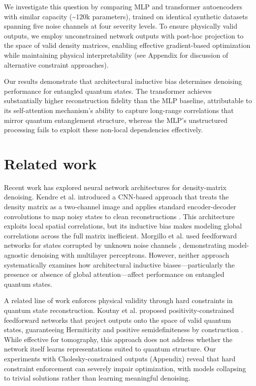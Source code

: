 \documentclass[11pt]{article}
\begin{document}
We investigate this question by comparing MLP and transformer autoencoders with similar capacity (\textasciitilde{}120k parameters), trained on identical synthetic datasets spanning five noise channels at four severity levels. To ensure physically valid outputs, we employ unconstrained network outputs with post-hoc projection to the space of valid density matrices, enabling effective gradient-based optimization while maintaining physical interpretability (see Appendix for discussion of alternative constraint approaches).

Our results demonstrate that architectural inductive bias determines denoising performance for entangled quantum states. The transformer achieves substantially higher reconstruction fidelity than the MLP baseline, attributable to its self-attention mechanism's ability to capture long-range correlations that mirror quantum entanglement structure, whereas the MLP's unstructured processing fails to exploit these non-local dependencies effectively.
\section{Related work}
\label{sec:orgf0de8a2}
Recent work has explored neural network architectures for density-matrix denoising. Kendre et al. introduced a CNN-based approach that treats the density matrix as a two-channel image and applies standard encoder-decoder convolutions to map noisy states to clean reconstructions \citep{kendre2025machinelearningquantumnoise}. This architecture exploits local spatial correlations, but its inductive bias makes modeling global correlations across the full matrix inefficient. Morgillo et al. used feedforward networks for states corrupted by unknown noise channels \citep{Morgillo_2024}, demonstrating model-agnostic denoising with multilayer perceptrons. However, neither approach systematically examines how architectural inductive biases—particularly the presence or absence of global attention—affect performance on entangled quantum states.

A related line of work enforces physical validity through hard constraints in quantum state reconstruction. Koutny et al. proposed positivity-constrained feedforward networks that project outputs onto the space of valid quantum states, guaranteeing Hermiticity and positive semidefiniteness by construction \citep{PhysRevA.106.012409}. While effective for tomography, this approach does not address whether the network itself learns representations suited to quantum structure. Our experiments with Cholesky-constrained outputs (Appendix) reveal that hard constraint enforcement can severely impair optimization, with models collapsing to trivial solutions rather than learning meaningful denoising.
\end{document}
